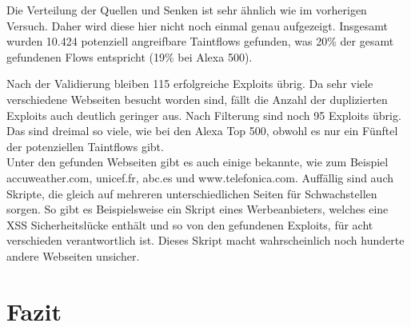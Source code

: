 Die Verteilung der Quellen und Senken ist sehr ähnlich wie im vorherigen Versuch. Daher wird diese hier nicht noch einmal genau aufgezeigt. Insgesamt wurden 10.424 potenziell angreifbare Taintflows gefunden, was 20\% der gesamt gefundenen Flows entspricht (19\% bei Alexa 500).

Nach der Validierung bleiben 115 erfolgreiche Exploits übrig. Da sehr viele verschiedene Webseiten besucht worden sind, fällt die Anzahl der duplizierten Exploits auch deutlich geringer aus. Nach Filterung sind noch 95 Exploits übrig. Das sind dreimal so viele, wie bei den Alexa Top 500, obwohl es nur ein Fünftel der potenziellen Taintflows gibt. \\
Unter den gefunden Webseiten gibt es auch einige bekannte, wie zum Beispiel accuweather.com, unicef.fr, abc.es und www.telefonica.com. Auffällig sind auch Skripte, die gleich auf mehreren unterschiedlichen Seiten für Schwachstellen sorgen. So gibt es Beispielsweise ein Skript eines Werbeanbieters, welches eine XSS Sicherheitslücke enthält und so von den gefundenen Exploits, für acht verschieden verantwortlich ist. Dieses Skript macht wahrscheinlich noch hunderte andere Webseiten unsicher.








\chapter{Fazit}
